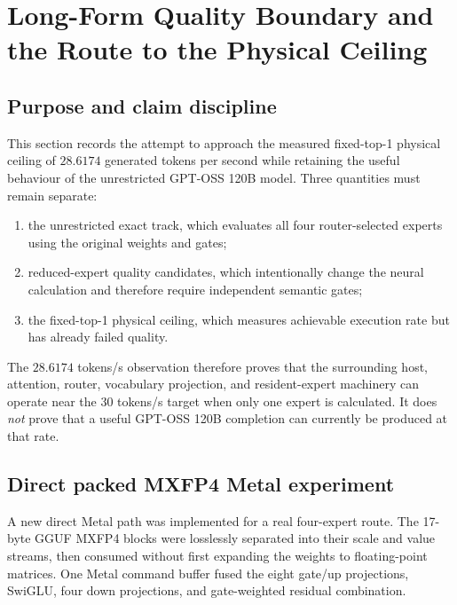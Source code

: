 
\section{Long-Form Quality Boundary and the Route to the Physical Ceiling}
\label{sec:gptoss120b-long-quality-boundary}

\subsection{Purpose and claim discipline}

This section records the attempt to approach the measured fixed-top-1 physical
ceiling of $28.6174$ generated tokens per second while retaining the useful
behaviour of the unrestricted GPT-OSS 120B model.  Three quantities must remain
separate:

\begin{enumerate}
  \item the unrestricted exact track, which evaluates all four router-selected
        experts using the original weights and gates;
  \item reduced-expert quality candidates, which intentionally change the
        neural calculation and therefore require independent semantic gates;
  \item the fixed-top-1 physical ceiling, which measures achievable execution
        rate but has already failed quality.
\end{enumerate}

The $28.6174$ tokens/s observation therefore proves that the surrounding host,
attention, router, vocabulary projection, and resident-expert machinery can
operate near the 30 tokens/s target when only one expert is calculated.  It does
\emph{not} prove that a useful GPT-OSS 120B completion can currently be produced
at that rate.

\subsection{Direct packed MXFP4 Metal experiment}

A new direct Metal path was implemented for a real four-expert route.  The
17-byte GGUF MXFP4 blocks were losslessly separated into their scale and value
streams, then consumed without first expanding the weights to floating-point
matrices.  One Metal command buffer fused the eight gate/up projections,
SwiGLU, four down projections, and gate-weighted residual combination.

